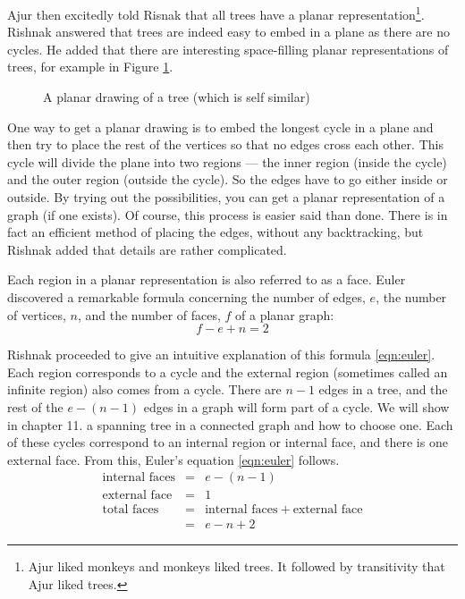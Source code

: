  Ajur then excitedly told Risnak that all trees have a planar representation\footnote{Ajur liked monkeys and monkeys liked trees. It followed by transitivity that Ajur liked trees.}. Rishnak answered that trees are indeed easy to embed in a plane as there are
 no cycles. He added that there are interesting space-filling planar representations of trees, for example in Figure \ref{9g7}.
\begin{figure}
\begin{center}    

  \caption{ A planar drawing of a tree (which is self similar)}\label{9g7}
  \end{center}
\end{figure}

One way to get a planar drawing is to embed the longest cycle in a plane and then try to place the rest of the vertices so that no edges cross each other. This cycle will divide the plane into two regions --- the inner region (inside the cycle) and the outer region (outside the cycle). So the edges have to go either inside or outside. By trying out the possibilities, you can get a planar representation of a graph (if one exists). Of course, this process is easier said than done. There is in fact an efficient method of placing the edges, without any backtracking, but Rishnak added that details are rather complicated. 

Each region in a planar representation is also referred to as a face. Euler discovered a remarkable formula concerning the number of edges, $e$, the number of vertices, $n$, and the number of faces, $f$ of a planar graph:
\begin{equation}
\label{eqn:euler}
  f-e+n=2 
\end{equation}

 

Rishnak proceeded to give an intuitive explanation of this formula \ref{eqn:euler}. Each region corresponds to a cycle and the external region (sometimes called an infinite region) also comes from a cycle. 
There are $n-1$ edges in a tree, and the rest of the $e-(n-1)$ edges in a graph will form part of a cycle. We will show in chapter 11. a spanning tree in a connected graph and how to choose one.
Each of these cycles correspond to an internal region or internal face, and there is one external face. From this, Euler's equation \ref{eqn:euler} follows.
\begin{eqnarray}
    \label{eqn:cycles}
    \text{internal faces}&=&e-(n-1)\nonumber\\
    \text{external face}&=&1 \nonumber \\
    \text{total faces}&=& \text{internal faces}~+~\text{external face} \nonumber \\
    &=&e-n+2
\end{eqnarray}


